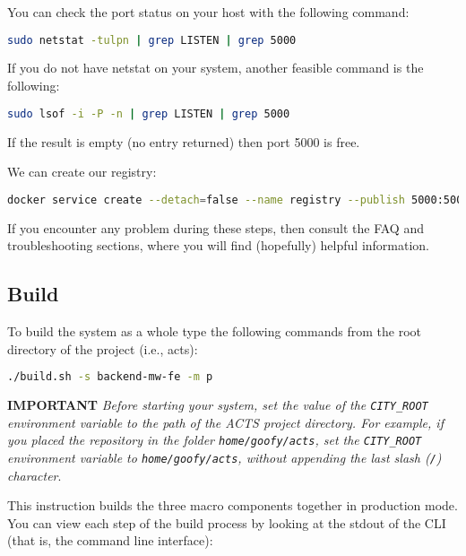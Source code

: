 You can check the port status on your host with the following command:

\begin{lstlisting}[language=bash]
sudo netstat -tulpn | grep LISTEN | grep 5000
\end{lstlisting}

If you do not have netstat on your system, another feasible command is the
following:

\begin{lstlisting}[language=bash]
sudo lsof -i -P -n | grep LISTEN | grep 5000
\end{lstlisting}

If the result is empty (no entry returned) then port 5000 is free.

We can create our registry:

\begin{lstlisting}[language=bash]
docker service create --detach=false --name registry --publish 5000:5000 registry:latest
\end{lstlisting}

If you encounter any problem during these steps, then
consult the FAQ and troubleshooting sections, where you will find (hopefully)
helpful information.

\subsection{Build}\label{sec:sys-build}

To build the system as a whole type the following commands from the root
directory of the project (i.e., acts):

\begin{lstlisting}[language=bash]
./build.sh -s backend-mw-fe -m p
\end{lstlisting}

\noindent\textbf{IMPORTANT} \textit{Before starting your system, set the value
of the \texttt{CITY\_ROOT} environment variable to the path of the ACTS project
directory. For example, if you placed the repository in the folder
\texttt{home/goofy/acts}, set the \texttt{CITY\_ROOT} environment variable to
\texttt{home/goofy/acts}, without appending the last slash (\texttt{/})
character}.

This instruction builds the three macro components together in production mode.
You can view each step of the build process by looking at the stdout of the CLI
(that is, the command line interface):

